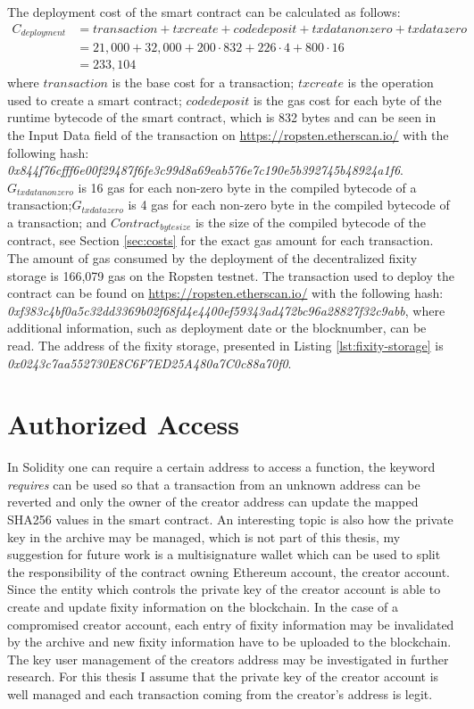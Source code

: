 The deployment cost of the smart contract can be calculated as follows:
\begin{equation}\label{eq:create-cost}
  \begin{split}
      C_{deployment} & = transaction + txcreate + codedeposit + txdatanonzero + txdatazero \\
      & = 21,000 + 32,000 + 200 \cdot 832 + 226 \cdot 4 + 800 \cdot 16 \\
      & = 233,104
  \end{split}
\end{equation}
where $transaction$ is the base cost for a transaction; $txcreate$ is the operation used to create a smart contract; $codedeposit$ is the gas cost for each byte of the runtime bytecode of the smart contract, which is 832 bytes and can be seen in the Input Data field of the transaction on \url{https://ropsten.etherscan.io/} with the following hash: \textit{0x844f76cfff6e00f29487f6fe3c99d8a69eab576e7c190e5b392745b48924a1f6}.
\textit{$G_{txdatanonzero}$} is 16 gas for each non-zero byte in the compiled bytecode of a transaction;\textit{$G_{txdatazero}$} is 4 gas for each non-zero byte in the compiled bytecode of a transaction; and \textit{$Contract_{bytesize}$} is the size of the compiled bytecode of the contract, see Section \ref{sec:costs} for the exact gas amount for each transaction.
The amount of gas consumed by the deployment of the decentralized fixity storage is 166,079 gas on the Ropsten testnet. The transaction used to deploy the contract can be found on \url{https://ropsten.etherscan.io/} with the following hash: \textit{0xf383c4bf0a5c32dd3369b02f68fd4e4400ef59343ad472bc96a28827f32c9abb}, where additional information, such as deployment date or the blocknumber, can be read. The address of the fixity storage, presented in Listing \ref{lst:fixity-storage} is \textit{0x0243c7aa552730E8C6F7ED25A480a7C0c88a70f0}.
\section{Authorized Access}
In Solidity one can require a certain address to access a function, the keyword \textit{requires} can be used so that a transaction from an unknown address can be reverted and only the owner of the creator address can update the mapped SHA256 values in the smart contract. An interesting topic is also how the private key in the archive may be managed, which is not part of this thesis, my suggestion for future work is a  multisignature wallet which can be used to split the responsibility of the contract owning Ethereum account, the creator account. Since the entity which controls the private key of the creator account is able to create and update fixity information on the blockchain. In the case of a compromised creator account, each entry of fixity information may be invalidated by the archive and new fixity information have to be uploaded to the blockchain. The key user management of the creators address may be investigated in further research. For this thesis I assume that the private key of the creator account is well managed and each transaction coming from the creator's address is legit.
